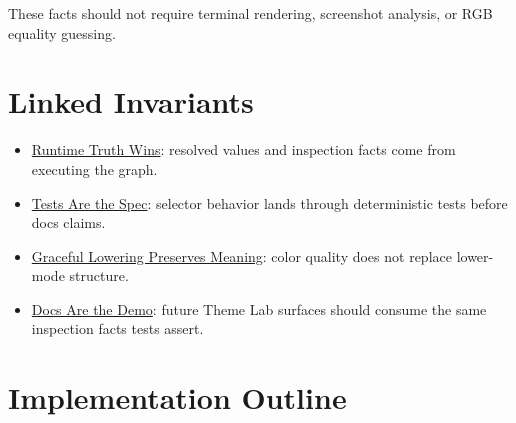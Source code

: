 These facts should not require terminal rendering, screenshot analysis, or RGB equality guessing.

\section{Linked Invariants}\label{record-184-linked-invariants}

\begin{itemize}
\tightlist
\item
  \href{https://github.com/flyingrobots/bijou/blob/cbd70612140e7a450d764b3c7be1c6af878b99bc/docs/invariants/runtime-truth-wins.md}{Runtime Truth Wins}: resolved values and inspection facts come from executing the graph.
\item
  \href{https://github.com/flyingrobots/bijou/blob/cbd70612140e7a450d764b3c7be1c6af878b99bc/docs/invariants/tests-are-the-spec.md}{Tests Are the Spec}: selector behavior lands through deterministic tests before docs claims.
\item
  \href{https://github.com/flyingrobots/bijou/blob/cbd70612140e7a450d764b3c7be1c6af878b99bc/docs/invariants/graceful-lowering-preserves-meaning.md}{Graceful Lowering Preserves Meaning}: color quality does not replace lower-mode structure.
\item
  \href{https://github.com/flyingrobots/bijou/blob/cbd70612140e7a450d764b3c7be1c6af878b99bc/docs/invariants/docs-are-the-demo.md}{Docs Are the Demo}: future Theme Lab surfaces should consume the same inspection facts tests assert.
\end{itemize}

\section{Implementation Outline}\label{record-184-implementation-outline}

